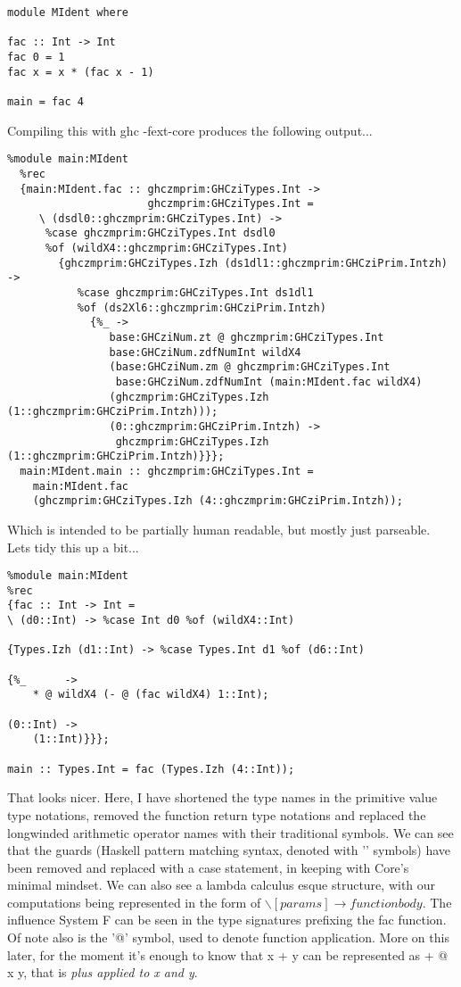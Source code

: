 \begin{verbatim}
module MIdent where

fac :: Int -> Int
fac 0 = 1
fac x = x * (fac x - 1)

main = fac 4
\end{verbatim}

\noindent Compiling this with ghc -fext-core produces the following output...

\begin{verbatim}
%module main:MIdent
  %rec
  {main:MIdent.fac :: ghczmprim:GHCziTypes.Int ->
                      ghczmprim:GHCziTypes.Int =
     \ (dsdl0::ghczmprim:GHCziTypes.Int) ->
      %case ghczmprim:GHCziTypes.Int dsdl0
      %of (wildX4::ghczmprim:GHCziTypes.Int)
        {ghczmprim:GHCziTypes.Izh (ds1dl1::ghczmprim:GHCziPrim.Intzh) ->
           %case ghczmprim:GHCziTypes.Int ds1dl1
           %of (ds2Xl6::ghczmprim:GHCziPrim.Intzh)
             {%_ ->
                base:GHCziNum.zt @ ghczmprim:GHCziTypes.Int 
                base:GHCziNum.zdfNumInt wildX4
                (base:GHCziNum.zm @ ghczmprim:GHCziTypes.Int
                 base:GHCziNum.zdfNumInt (main:MIdent.fac wildX4)
                (ghczmprim:GHCziTypes.Izh (1::ghczmprim:GHCziPrim.Intzh)));
                (0::ghczmprim:GHCziPrim.Intzh) ->
                 ghczmprim:GHCziTypes.Izh (1::ghczmprim:GHCziPrim.Intzh)}}};
  main:MIdent.main :: ghczmprim:GHCziTypes.Int =
    main:MIdent.fac
    (ghczmprim:GHCziTypes.Izh (4::ghczmprim:GHCziPrim.Intzh));
\end{verbatim}

\noindent Which is intended to be partially human readable, but mostly
just parseable. Lets tidy this up a bit...

\begin{verbatim}
%module main:MIdent
%rec
{fac :: Int -> Int =
\ (d0::Int) -> %case Int d0 %of (wildX4::Int)

{Types.Izh (d1::Int) -> %case Types.Int d1 %of (d6::Int)

{%_      ->
    * @ wildX4 (- @ (fac wildX4) 1::Int);

(0::Int) ->
    (1::Int)}}};

main :: Types.Int = fac (Types.Izh (4::Int));
\end{verbatim}

\noindent That looks nicer. Here, I have shortened the type names in the
primitive value type notations, removed the function return type notations
and replaced the longwinded arithmetic operator names with their traditional
symbols. We can see that the guards (Haskell pattern matching syntax, denoted
with '\textbar' symbols) have been removed and replaced with a case statement, in
keeping with Core's minimal mindset. We can also see a lambda calculus esque
structure, with our computations being represented in the form of \( \backslash
 [params] \rightarrow function body\). The influence System F can be seen in
 the type signatures prefixing the fac function. Of note also is the '@' symbol, used
 to denote function application. More on this later, for the moment it's enough
 to know that x + y can be represented as + @ x y, that is \emph{plus applied to
 x and y}.
 

